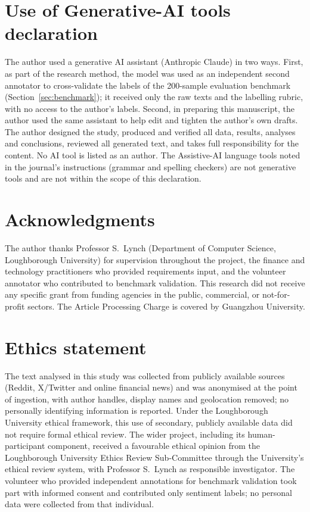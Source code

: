 \documentclass[12pt,a4paper]{article}
\begin{document}
\section*{Use of Generative-AI tools declaration}
The author used a generative AI assistant (Anthropic Claude) in two ways. First,
as part of the research method, the model was used as an independent second
annotator to cross-validate the labels of the 200-sample evaluation benchmark
(Section~\ref{sec:benchmark}); it received only the raw texts and the labelling
rubric, with no access to the author's labels. Second, in preparing this
manuscript, the author used the same assistant to help edit and tighten the
author's own drafts. The author designed the study, produced and verified all data,
results,
analyses and conclusions, reviewed all generated text, and takes full
responsibility for the content. No AI tool is listed as an author. The Assistive-AI
language tools noted in the journal's instructions (grammar and spelling checkers)
are not generative tools and are not within the scope of this declaration.

\section*{Acknowledgments}
The author thanks Professor S.\ Lynch (Department of Computer Science, Loughborough
University) for supervision throughout the project, the finance and technology
practitioners who provided requirements input, and the volunteer annotator who
contributed to benchmark validation. This research did not receive any specific grant
from funding agencies in the public, commercial, or not-for-profit sectors. The
Article Processing Charge is covered by Guangzhou University.

\section*{Ethics statement}
The text analysed in this study was collected from publicly available sources
(Reddit, X/Twitter and online financial news) and was anonymised at the point of
ingestion, with author handles, display names and geolocation removed; no
personally identifying information is reported. Under the Loughborough University
ethical framework, this use of secondary, publicly available data did not require
formal ethical review. The wider project, including its human-participant component,
received a favourable ethical opinion from the Loughborough University Ethics Review
Sub-Committee through the University's ethical review system, with Professor S.\ Lynch
as responsible investigator. The volunteer who provided independent annotations for
benchmark validation took part with informed consent and contributed only sentiment
labels; no personal data were collected from that individual.
\end{document}

